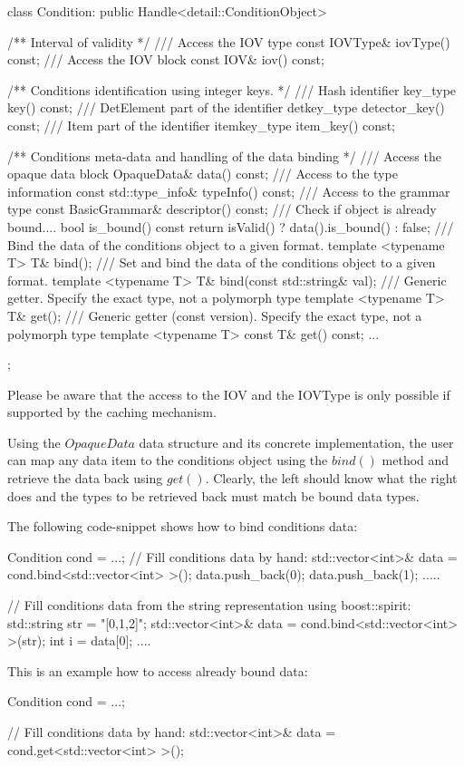 \documentclass[10pt,a4paper]{article}
\begin{document}
\begin{unnumberedcode}
  class Condition: public Handle<detail::ConditionObject> {
    /** Interval of validity                                   */
    /// Access the IOV type
    const IOVType& iovType()  const;
    /// Access the IOV block
    const IOV& iov()  const;
 
    /** Conditions identification using integer keys.          */
    /// Hash identifier
    key_type key()  const;
    /// DetElement part of the identifier
    detkey_type  detector_key()  const;
    /// Item part of the identifier
    itemkey_type item_key()  const;

    /** Conditions meta-data and handling of the data binding  */
    /// Access the opaque data block
    OpaqueData& data()  const;
    /// Access to the type information
    const std::type_info& typeInfo() const;
    /// Access to the grammar type
    const BasicGrammar& descriptor() const;
    /// Check if object is already bound....
    bool is_bound()  const  {  return isValid() ? data().is_bound() : false;  }
    /// Bind the data of the conditions object to a given format.
    template <typename T> T& bind();
    /// Set and bind the data of the conditions object to a given format.
    template <typename T> T& bind(const std::string& val);
    /// Generic getter. Specify the exact type, not a polymorph type
    template <typename T> T& get();
    /// Generic getter (const version). Specify the exact type, not a polymorph type
    template <typename T> const T& get() const;
    ...
  };
\end{unnumberedcode}
Please be aware that the access to the IOV and the IOVType is only 
possible if supported by the caching mechanism.

\noindent
Using the $OpaqueData$ data structure and its concrete implementation,
the user can map any data item to the conditions object using the 
$bind()$ method and retrieve the data back using $get()$.
Clearly, the left should know what the right does and the types to be
retrieved back must match be bound data types.

\noindent
The following code-snippet shows how to bind conditions data:
\vspace{-0.2cm}
\begin{unnumberedcode}
  Condition cond = ...;
  // Fill conditions data by hand:
  std::vector<int>& data = cond.bind<std::vector<int> >();
  data.push_back(0);
  data.push_back(1);    .....

  // Fill conditions data from the string representation using boost::spirit:
  std::string str = "[0,1,2]";
  std::vector<int>& data = cond.bind<std::vector<int> >(str);
  int i = data[0]; ....  
\end{unnumberedcode}
This is an example how to access already bound data:
\vspace{-0.2cm}
\begin{unnumberedcode}
  Condition cond = ...;

  // Fill conditions data by hand:
  std::vector<int>& data = cond.get<std::vector<int> >();
\end{unnumberedcode}
\end{document}
